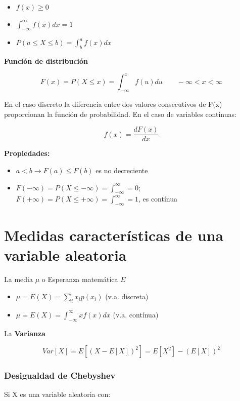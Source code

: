 \documentclass[]{article}
\numberwithin{equation}{section}
\begin{document}
\begin{itemize}
\item
  \(f(x) \geq 0\)
\item
  \(\int_{-\infty}^{\infty}f(x)dx=1\)
\item
  \(P(a \leq X \leq b) = \int_b^a f(x)dx\)
\end{itemize}

\textbf{Función de distribución}

\[
    F(x) = P(X\leq x) = \int_{-\infty}^{x} f(u)du \qquad -\infty < x < \infty
\]

En el caso discreto la diferencia entre dos valores consecutivos de F(x)
proporcionan la función de probabilidad. En el caso de variables
continuas:

\[  
    f(x) = \frac{d F(x)}{dx}
\]

\textbf{Propiedades:}

\begin{itemize}
\item
  \(a<b \rightarrow F(a) \leq F(b)\) es no decreciente
\item
  \(F(-\infty) = P(X\leq -\infty) = \int_{-\infty}^{\infty} = 0\);
  \(F(+\infty) = P(X\leq +\infty) = \int_{-\infty}^{\infty} = 1\), es
  contínua
\end{itemize}

\section{Medidas características de una variable
aleatoria}\label{medidas-caracteristicas-de-una-variable-aleatoria}

La media \(\mu\) o Esperanza matemática \(E\)

\begin{itemize}
\item
  \(\mu = E(X) = \sum_{i} x_i p(x_i)\) \qquad (v.a. discreta)
\item
  \(\mu = E(X) = \int_{-\infty}^{\infty} x f(x)dx\) \qquad (v.a.
  contínua)
\end{itemize}

La \textbf{Varianza}

\[
    Var[X] = E\left[ (X-E[X])^2\right]  = E[X^2] - (E[X])^2
\]

\subsubsection{Desigualdad de Chebyshev}\label{desigualdad-de-chebyshev}

Si X es una variable aleatoria con:
\end{document}
